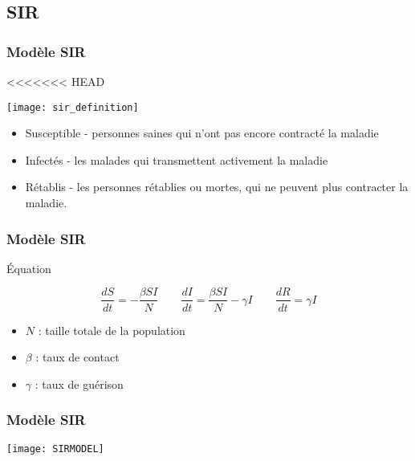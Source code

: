 \subsection{SIR}

\begin{frame}
        \frametitle{Modèle SIR}

<<<<<<< HEAD
        \begin{center}
                \texttt{[image: sir\_definition]}
        \end{center}


        \begin{itemize}
                \item Susceptible - personnes saines qui n'ont pas encore contracté la maladie
                \item Infectés - les malades qui transmettent activement la maladie
                \item Rétablis - les personnes rétablies ou mortes, qui ne peuvent plus contracter la maladie.
        \end{itemize}

\end{frame}


\begin{frame}
        \frametitle{Modèle SIR}

        \begin{alertblock}{Équation}

                $$ \frac{dS}{dt} = -\frac{\beta SI}{N} \qquad \frac{dI}{dt} = \frac{\beta SI}{N} - \gamma I \qquad \frac{dR}{dt} = \gamma I $$

                \begin{itemize}
                        \item $N$ : taille totale de la population
                        \item $\beta$ : taux de contact
                        \item $\gamma$ : taux de guérison
                \end{itemize}

        \end{alertblock}
\end{frame}


\begin{frame}
        \frametitle{Modèle SIR}
        		\centering

		\texttt{[image: SIRMODEL]}
\end{frame}	
	 

